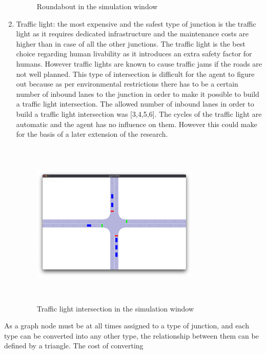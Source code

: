 \documentclass[
]{elteikthesis}[2023/04/10]
\begin{document}
\begin{enumerate}
\begin{figure}[H]
\begin{centering}
\par\end{centering}
\caption{Roundabout in the simulation window}
\end{figure}
\item Traffic light: the most expensive and the safest type of junction
is the traffic light as it requires dedicated infrastructure and the
maintenance costs are higher than in case of all the other junctions.
The traffic light is the best choice regarding human livability as
it introduces an extra safety factor for humans. However traffic lights
are known to cause traffic jams if the roads are not well planned.
This type of intersection is difficult for the agent to figure out
because as per environmental restrictions there has to be a certain
number of inbound lanes to the junction in order to make it possible
to build a traffic light intersection. The allowed number of inbound
lanes in order to build a traffic light intersection was {[}3,4,5,6{]}.
The cycles of the traffic light are automatic and the agent has no
influence on them. However this could make for the basis of a later
extension of the research. 
\begin{figure}[H]
\begin{centering}
\includegraphics[width=8cm,height=8cm,keepaspectratio]{images/junction_trafficlight}
\par\end{centering}
\caption{Traffic light intersection in the simulation window}
\end{figure}
\end{enumerate}
As a graph node must be at all times assigned to a type of junction,
and each type can be converted into any other type, the relationship
between them can be defined by a triangle. The cost of converting
\end{document}
